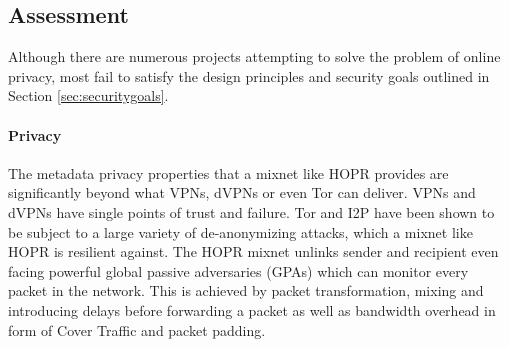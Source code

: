 \subsection{Assessment}

Although there are numerous projects attempting to solve the problem of online privacy, most fail to satisfy the design principles and security goals outlined in Section \ref{sec:securitygoals}.

\paragraph{Privacy} The metadata privacy properties that a mixnet like HOPR provides are significantly beyond what VPNs, dVPNs or even Tor can deliver. VPNs and dVPNs have single points of trust and failure. Tor and I2P have been shown to be subject to a large variety of de-anonymizing attacks, which a mixnet like HOPR is resilient against. The HOPR mixnet unlinks sender and recipient even facing powerful global passive adversaries (GPAs) which can monitor every packet in the network. This is achieved by packet transformation, mixing and introducing delays before forwarding a packet as well as bandwidth overhead in form of Cover Traffic and packet padding.

